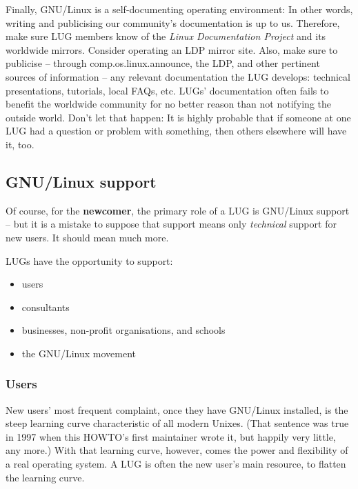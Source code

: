 Finally, GNU/Linux is a self-documenting operating environment: In other
words, writing and publicising our community's documentation is up to
us.  Therefore, make sure LUG members know of the 
\emph{Linux Documentation Project} \texttt{\acourl}
 and its worldwide
mirrors.  Consider operating an LDP mirror site.  Also, make sure to
publicise -- through {\ttfamily comp.os.linux.announce}, the LDP, and other
pertinent sources of information -- any relevant documentation the LUG
develops: technical presentations, tutorials, local FAQs, etc.  LUGs'
documentation often fails to benefit the worldwide community for no
better reason than not notifying the outside world.  Don't let that
happen:  It is highly probable that if someone at one LUG had a question
or problem with something, then others elsewhere will have it, too.




\subsection{GNU/Linux support}

Of course, for the {\bfseries newcomer}, the primary role of a
LUG is GNU/Linux support -- but it is a mistake to suppose that 
support means only {\itshape technical\/} support for new users. It
should mean much more.

LUGs have the opportunity to support:

\begin{itemize}
\item users
\item consultants
\item businesses, non-profit organisations, and schools
\item the GNU/Linux movement
\end{itemize}





\subsubsection{Users}

New users' most frequent complaint, once they have GNU/Linux
installed, is the steep learning curve characteristic of all modern 
Unixes. (That sentence was true in 1997 when this HOWTO's first
maintainer wrote it, but happily very little, any more.)  With that learning
curve, however, comes the power and flexibility of a real operating
system. A LUG is often the new user's main resource, to flatten the
learning curve.

